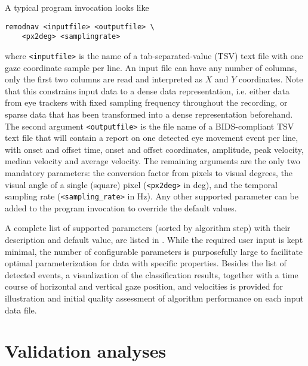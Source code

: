 A typical program invocation looks like
%
\begin{verbatim}
remodnav <inputfile> <outputfile> \
    <px2deg> <samplingrate>
\end{verbatim}
%
where \texttt{<inputfile>} is the name of a tab-separated-value (TSV) text file
with one gaze coordinate sample per line. An input file can have any number of
columns, only the first two columns are read and interpreted as $X$ and $Y$
coordinates. Note that this constrains input data to a dense data representation,
i.e. either data from eye trackers with fixed sampling frequency throughout the
recording, or sparse data that has been transformed into a dense representation
beforehand.
The second argument \texttt{<outputfile>} is the file name of a
BIDS-compliant \citep{gorgolewski2016brain} TSV text file that will contain a
report on one detected eye movement event per line, with onset and offset time,
onset and offset coordinates, amplitude, peak velocity, median velocity and
average velocity. The remaining arguments are the only two mandatory
parameters: the conversion factor from pixels to visual degrees, \ie the visual
angle of a single (square) pixel (\texttt{<px2deg>} in \unit{deg}), and the
temporal sampling rate (\texttt{<sampling\_rate>} in \unit{Hz}).
Any other supported parameter can be added to the program invocation to override
the default values.

A complete list of supported parameters (sorted by algorithm step) with their
description and default value, are listed in \tab{parameters}.
While the required user input is kept minimal, the number of configurable
parameters is purposefully large to facilitate optimal parameterization for
data with specific properties. Besides the list of detected events, a
visualization of the classification results, together with a time course of
horizontal and vertical gaze position, and velocities is provided for
illustration and initial quality assessment of algorithm performance on each
input data file.


\section*{Validation analyses}\label{ana}


